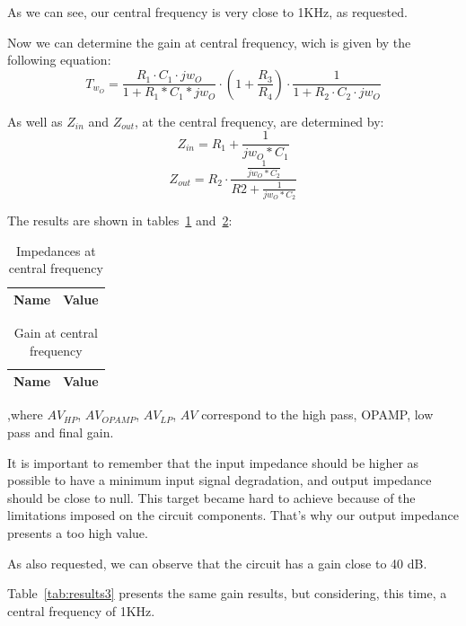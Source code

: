 As we can see, our central frequency is very close to 1KHz, as requested.

Now we can determine the gain at central frequency, wich is given by the following equation:
\begin{equation}
	T_{w_O}=\frac{R_1\cdot C_1 \cdot jw_O}{1+R_1*C_1*jw_O}\cdot(1+ \frac{R_3}{R_4}) \cdot \frac{1}{1+R_2 \cdot C_2\cdot jw_O}
\end{equation}

As well as $Z_{in}$ and $Z_{out}$, at the central frequency, are determined by:
\begin{equation}
	Z_{in}=R_1+\frac{1}{jw_O*C_1}
\end{equation}
\begin{equation}
	Z_{out}=R_2 \cdot \frac{\frac{1}{jw_O*C_2}}{R2+\frac{1}{jw_O*C_2}}
\end{equation}

The results are shown in tables~\ref{tab:results1} and~\ref{tab:results2}:
\begin{table}[H]
  \centering
  \begin{tabular}{|l|r|}
     \hline    
    {\bf Name} & {\bf Value} \\ \hline   
    
  \end{tabular}
  \caption{Impedances at central frequency}
  \label{tab:results1}
\end{table}
\begin{table}[H]
  \centering
  \begin{tabular}{|l|r|}
     \hline    
    {\bf Name} & {\bf Value} \\ \hline   
    
  \end{tabular}
  \caption{Gain at central frequency}
  \label{tab:results2}
\end{table}
,where $AV_{HP}$, $AV_{OPAMP}$, $AV_{LP}$, $AV$ correspond to the high pass, OPAMP, low pass and final gain.

It is important to remember that the input impedance should be higher as possible to have a minimum input signal degradation,
and output impedance should be close to null. This target became hard to achieve because of the limitations imposed on the circuit components.
That's why our output impedance presents a too high value.

As also requested, we can observe that the circuit has a gain close to 40 dB.

Table~\ref{tab:results3} presents the same gain results, but considering, this time, a central frequency of 1KHz.


